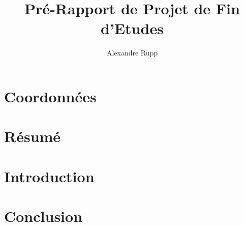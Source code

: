 \documentclass[liens,entete-ensimag,margeCorrection,onecolumn,12pt]{ensirapport}
\date{} %
\begin{document}
\title{Pré-Rapport de Projet de Fin d'Etudes}
\author{Alexandre Rupp}
\date{}

\maketitle
 \thispagestyle{empty}
 
 
\newpage
\thispagestyle{fancy}

\newpage
\section*{Coordonnées}  

\tableofcontents
\newpage

\listoffigures

\newpage
\section*{Résumé}  

\newpage
\newcommand{\lc}{\cellcolor{blue!60}}
\renewcommand{\arraystretch}{1.3}
\section*{Introduction}  


\newpage

\section{Conclusion} %


  \newpage
  \printnoidxglossary
  \newpage
  
\begin{appendices}
\end{appendices}
\end{document}
